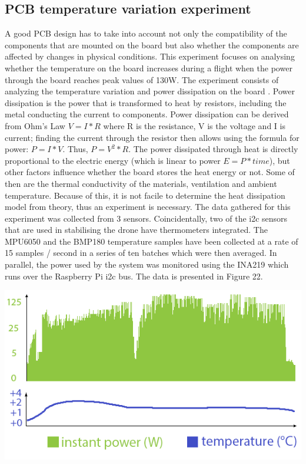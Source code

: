 \documentclass{IEEEtran}
\begin{document}
\subsection{PCB temperature variation experiment}
A good PCB design has to take into account not only the compatibility of the components that are mounted on the board but also whether the components are affected by changes in physical conditions. This experiment focuses on analysing whether the temperature on the board increases during a flight when the power through the board reaches peak values of 130W.
\newline
\newline
The experiment consists of analyzing the temperature variation and power dissipation on the board \citep{cheng_2008_theoretical}. Power dissipation is the power that is transformed to heat by resistors, including the metal conducting the current to components. Power dissipation can be derived from Ohm's Law $V = I * R$ where R is the resistance, V is the voltage and I is current; finding the current through the resistor then allows using the formula for power: $P = I * V$. Thus, $P = V^2*R$. The power dissipated through heat is directly proportional to the electric energy (which is linear to power $E = P * time$), but other factors influence whether the board stores the heat energy or not. Some of then are the thermal conductivity of the materials, ventilation and ambient temperature. Because of this, it is not facile to determine the heat dissipation model from theory, thus an experiment is necessary.
The data gathered for this experiment was collected from 3 sensors. Coincidentally, two of the i2c sensors that are used in stabilising the drone have thermometers integrated. The MPU6050 and the BMP180 temperature samples have been collected at a rate of 15 samples / second in a series of ten batches which were then averaged. In parallel, the power used by the system was monitored using the INA219 which runs over the Raspberry Pi i2c bus. The data is presented in Figure 22.
\begin{center}\includegraphics[scale=.70]{power_temperature.png}\end{center}
\end{document}
